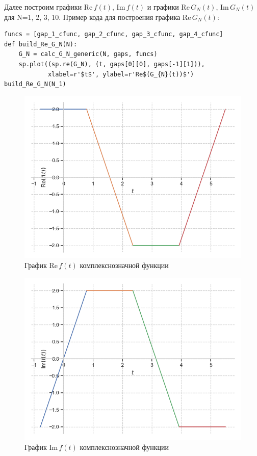 \documentclass[a4paper, 16pt]{article}
\begin{document}
\noindent Далее построим графики Re$\,f(t)$, Im$\,f(t)$ и графики Re$\,G_N(t)$, Im$\,G_N(t)$ для N=1, 2, 3, 10.
Пример кода для построения графика Re$\,G_N(t)$:
\begin{lstlisting}
funcs = [gap_1_cfunc, gap_2_cfunc, gap_3_cfunc, gap_4_cfunc]
def build_Re_G_N(N):
    G_N = calc_G_N_generic(N, gaps, funcs)
    sp.plot((sp.re(G_N), (t, gaps[0][0], gaps[-1][1])),
            xlabel=r'$t$', ylabel=r'Re$(G_{N}(t))$')
build_Re_G_N(N_1)
\end{lstlisting}


\newpage
\vspace*{10mm}
\begin{figure}[!htb]
    \centering
    \includegraphics[scale=0.8]{re_cf(t).png}
    \captionsetup{skip=0pt}
    \caption{График Re$\,f(t)$ комплекснозначной функции}
    \label{Рис:40}
\end{figure}
\begin{figure}[!htb]
    \centering
    \includegraphics[scale=0.8]{im_cf(t).png}
    \captionsetup{skip=0pt}
    \caption{График Im$\,f(t)$ комплекснозначной функции}
    \label{Рис:41}
\end{figure}
\end{document}
